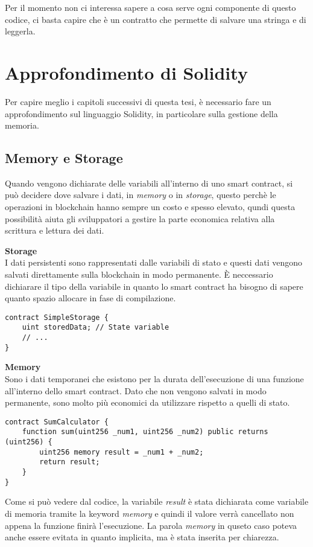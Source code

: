 Per il momento non ci interessa sapere a cosa serve ogni componente di questo 
codice, ci basta capire che è un contratto che permette di salvare una stringa
e di leggerla. 

\section{Approfondimento di Solidity}
Per capire meglio i capitoli successivi di questa tesi, è necessario fare un
approfondimento sul linguaggio Solidity, in particolare sulla gestione della 
memoria.

\subsection{Memory e Storage}
Quando vengono dichiarate delle variabili all'interno di uno smart contract, si
può decidere dove salvare i dati, in \textit{memory} o in \textit{storage}, 
questo perchè le operazioni in blockchain hanno sempre un costo e spesso elevato,
qundi questa possibilità aiuta gli sviluppatori a gestire la parte economica
relativa alla scrittura e lettura dei dati. \texttt{}\cite{storageVsMemoryCosts}

\textbf{Storage} \\
I dati persistenti sono rappresentati dalle variabili di stato e questi dati
vengono salvati direttamente sulla blockchain in modo permanente. È neccessario
dichiarare il tipo della variabile in quanto lo smart contract ha bisogno
di sapere quanto spazio allocare in fase di compilazione.
\begin{lstlisting}[language=Solidity]
contract SimpleStorage {
    uint storedData; // State variable
    // ...
}
\end{lstlisting}

\textbf{Memory} \\
Sono i dati temporanei che esistono per la durata dell'esecuzione di una
funzione all'interno dello smart contract. Dato che non vengono salvati in modo
permanente, sono molto più economici da utilizzare rispetto a quelli di stato.

\begin{lstlisting}[language=Solidity]
contract SumCalculator {
    function sum(uint256 _num1, uint256 _num2) public returns (uint256) {
        uint256 memory result = _num1 + _num2;
        return result;
    }
}
\end{lstlisting}

Come si può vedere dal codice, la variabile \textit{result} è stata dichiarata
come variabile di memoria tramite la keyword \textit{memory} e quindi il valore
verrà cancellato non appena la funzione finirà l'esecuzione. 
La parola \textit{memory} in quseto caso poteva anche essere evitata in quanto 
implicita, ma è stata inserita per chiarezza. 

